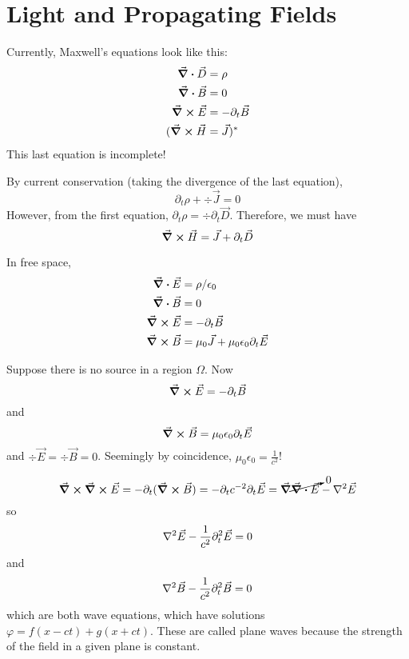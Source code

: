\documentclass[a4paper,twoside,master.tex]{subfiles}
\begin{document}
\section{Light and Propagating Fields}
\label{sec:light_and_propagating_fields}
Currently, Maxwell's equations look like this:
\begin{align}
    \div{ \vec{D}} &= \rho\\
    \div{ \vec{B}} &= 0\\
    \curl{ \vec{E}} &= -\partial_t \vec{B}\\
    (\curl{ \vec{H}} &= \vec{J})^*
\end{align}
This last equation is incomplete!

By current conservation (taking the divergence of the last equation),
\begin{equation}
    \partial_t\rho + \div{ \vec{J}} = 0
\end{equation}
However, from the first equation, $ \partial_t \rho = \div{\partial_t \vec{D}} $. Therefore, we must have
\begin{equation}
    \curl{ \vec{H}} = \vec{J} + \partial_t \vec{D}
\end{equation}

In free space,
\begin{align}
    \div{ \vec{E}} &= \rho / \epsilon_0\\
    \div{ \vec{B}} &= 0\\
    \curl{ \vec{E}} &= -\partial_t \vec{B}\\
    \curl{ \vec{B}} &= \mu_0 \vec{J} + \mu_0 \epsilon_0 \partial_t \vec{E}
\end{align}

Suppose there is no source in a region $ \Omega $. Now
\begin{equation}
    \curl{ \vec{E}} = -\partial_t \vec{B}
\end{equation}
and
\begin{equation}
    \curl{ \vec{B}} = \mu_0 \epsilon_0 \partial_t \vec{E}
\end{equation}
and $ \div{ \vec{E}} = \div{ \vec{B}} = 0 $. Seemingly by coincidence, $ \mu_0 \epsilon_0 = \frac{1}{c^2} $!

\begin{equation}
    \curl{\curl{ \vec{E}}} = -\partial_t(\curl{ \vec{B}}) = -\partial_t c^{-2}\partial_t \vec{E} = \grad{\cancelto{0}{\div{ \vec{E}}}} - \laplacian{ \vec{E}}
\end{equation}
so
\begin{equation}
    \laplacian{ \vec{E}} - \frac{1}{c^2} \partial_t^2 \vec{E} = 0
\end{equation}
and
\begin{equation}
    \laplacian{ \vec{B}} - \frac{1}{c^2} \partial_t^2 \vec{B} = 0
\end{equation}
which are both wave equations, which have solutions $ \varphi = f(x-ct) + g(x+ct) $. These are called plane waves because the strength of the field in a given plane is constant.
\end{document}
